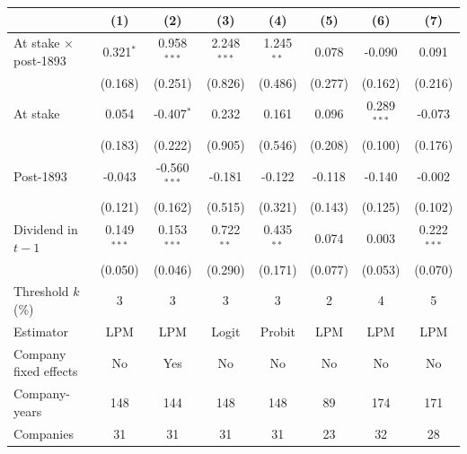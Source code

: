 \begin{tabular}{lccccccc}
\toprule
 & (1) & (2) & (3) & (4) & (5) & (6) & (7) \\
\midrule
At stake $\times$ post-1893 & 0.321$^{*}$ & 0.958$^{***}$ & 2.248$^{***}$ & 1.245$^{**}$ & 0.078 & -0.090 & 0.091 \\
 & (0.168) & (0.251) & (0.826) & (0.486) & (0.277) & (0.162) & (0.216) \\
At stake & 0.054 & -0.407$^{*}$ & 0.232 & 0.161 & 0.096 & 0.289$^{***}$ & -0.073 \\
 & (0.183) & (0.222) & (0.905) & (0.546) & (0.208) & (0.100) & (0.176) \\
Post-1893 & -0.043 & -0.560$^{***}$ & -0.181 & -0.122 & -0.118 & -0.140 & -0.002 \\
 & (0.121) & (0.162) & (0.515) & (0.321) & (0.143) & (0.125) & (0.102) \\
Dividend in $t-1$ & 0.149$^{***}$ & 0.153$^{***}$ & 0.722$^{**}$ & 0.435$^{**}$ & 0.074 & 0.003 & 0.222$^{***}$ \\
 & (0.050) & (0.046) & (0.290) & (0.171) & (0.077) & (0.053) & (0.070) \\
Threshold $k$ (\%) & 3 & 3 & 3 & 3 & 2 & 4 & 5 \\
Estimator & LPM & LPM & Logit & Probit & LPM & LPM & LPM \\
Company fixed effects & No & Yes & No & No & No & No & No \\
Company-years & 148 & 144 & 148 & 148 & 89 & 174 & 171 \\
Companies & 31 & 31 & 31 & 31 & 23 & 32 & 28 \\
\bottomrule
\end{tabular}
